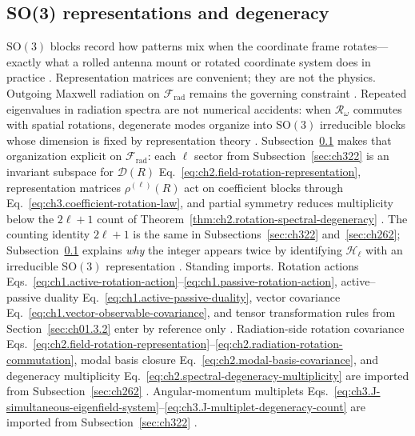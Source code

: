 \subsection{SO(3) representations and degeneracy}
\label{sec:ch323}
$\mathrm{SO}(3)$ blocks record how patterns mix when the coordinate frame rotates---exactly what a rolled antenna mount or rotated coordinate system does in practice \cite{stratton1941}. Representation matrices are convenient; they are not the physics. Outgoing Maxwell radiation on $\mathcal{F}_{\mathrm{rad}}$ remains the governing constraint \cite{stratton1941}.
Repeated eigenvalues in radiation spectra are not numerical accidents: when
\(\mathcal{R}_\omega\) commutes with spatial rotations, degenerate modes organize into
\(\mathrm{SO}(3)\) irreducible blocks whose dimension is fixed by representation theory
\cite{jackson1999}. Subsection~\ref{sec:ch323} makes that
organization explicit on \(\mathcal{F}_{\mathrm{rad}}\): each \(\ell\) sector from
Subsection~\ref{sec:ch322} is an invariant subspace for
\(\mathcal{D}(R)\) Eq.~\eqref{eq:ch2.field-rotation-representation}, representation matrices
\(\rho^{(\ell)}(R)\) act on coefficient blocks through
Eq.~\eqref{eq:ch3.coefficient-rotation-law}, and partial symmetry reduces multiplicity below
the \(2\ell+1\) count of Theorem~\ref{thm:ch2.rotation-spectral-degeneracy}
\cite{hansen1988}. The counting identity \(2\ell+1\) is the same in
Subsections~\ref{sec:ch322} and~\ref{sec:ch262}; Subsection~\ref{sec:ch323} explains \emph{why} the integer
appears twice by identifying \(\mathcal{H}_{\ell}\) with an irreducible \(\mathrm{SO}(3)\) representation
\cite{jackson1999}.
Standing imports. Rotation actions Eqs.~\eqref{eq:ch1.active-rotation-action}--\eqref{eq:ch1.passive-rotation-action},
active--passive duality Eq.~\eqref{eq:ch1.active-passive-duality}, vector covariance
Eq.~\eqref{eq:ch1.vector-observable-covariance}, and tensor transformation rules from
Section~\ref{sec:ch01.3.2} enter by reference only \cite{stratton1941}. Radiation-side
rotation covariance Eqs.~\eqref{eq:ch2.field-rotation-representation}--\eqref{eq:ch2.radiation-rotation-commutation},
modal basis closure Eq.~\eqref{eq:ch2.modal-basis-covariance}, and degeneracy multiplicity
Eq.~\eqref{eq:ch2.spectral-degeneracy-multiplicity} are imported from
Subsection~\ref{sec:ch262} \cite{stratton1941}. Angular-momentum multiplets
Eqs.~\eqref{eq:ch3.J-simultaneous-eigenfield-system}--\eqref{eq:ch3.J-multiplet-degeneracy-count}
are imported from Subsection~\ref{sec:ch322} \cite{jackson1999}.
